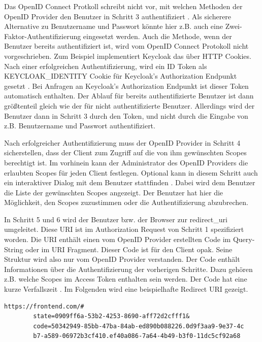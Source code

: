 Das OpenID Connect Protkoll schreibt nicht vor, mit welchen Methoden der OpenID Provider den Benutzer in Schritt 3 authentifiziert \cite{EB16}. Als sicherere Alternative zu Benutzername und Passwort könnte hier z.B. auch eine Zwei-Faktor-Authentifizierung eingesetzt werden. Auch die Methode, wenn der Benutzer bereits authentifiziert ist, wird vom OpenID Connect Protokoll nicht vorgeschrieben. Zum Beispiel implementiert Keycloak das über HTTP Cookies. Nach einer erfolgreichen Authentifizierung, wird ein ID Token als KEYCLOAK\_IDENTITY Cookie für Keycloak's Authorization Endpunkt gesetzt \cite{EB17}. Bei Anfragen an Keycloak's Authorization Endpunkt ist dieser Token automatisch enthalten. Der Ablauf für bereits authentifizierte Benutzer ist dann größtenteil gleich wie der für nicht authentifizierte Benutzer. Allerdings wird der Benutzer dann in Schritt 3 durch den Token, und nicht durch die Eingabe von z.B. Benutzername und Passwort authentifiziert.

Nach erfolgreicher Authentifizierung muss der OpenID Provider in Schritt 4 sicherstellen, dass der Client zum Zugriff auf die von ihm gewünschten Scopes berechtigt ist. Im vorhinein kann der Administrator des OpenID Providers die erlaubten Scopes für jeden Client festlegen. Optional kann in diesem Schritt auch ein interaktiver Dialog mit dem Benutzer stattfinden \cite{EB18}. Dabei wird dem Benutzer die Liste der gewünschten Scopes angezeigt. Der Benutzer hat hier die Möglichkeit, den Scopes zuzustimmen oder die Authentifizierung abzubrechen.

In Schritt 5 und 6 wird der Benutzer bzw. der Browser zur redirect\_uri umgeleitet. Diese URI ist im Authorization Request von Schritt 1 spezifiziert worden. Die URI enthält einen vom OpenID Provider erstellten Code im Query-String oder im URI Fragment. Dieser Code ist für den Client opak. Seine Struktur wird also nur vom OpenID Provider verstanden. Der Code enthält Informationen über die Authentifizierung der vorherigen Schritte. Dazu gehören z.B. welche Scopes im Access Token enthalten sein werden. Der Code hat eine kurze Verfallszeit \cite{EB21}. Im Folgenden wird eine beispielhafte Redirect URI gezeigt.

\begin{lstlisting}[caption=Beispiel Redirect URI, captionpos=b, label=EBBeispielRedirectURI]
https://frontend.com/#
        state=0909ff6a-53b2-4253-8690-aff72d2cfff1&
        code=50342949-85bb-47ba-84ab-ed890b088226.0d9f3aa9-9e37-4c
        b7-a589-06972b3cf410.ef40a086-7a64-4b49-b3f0-11dc5cf92a68
\end{lstlisting}

